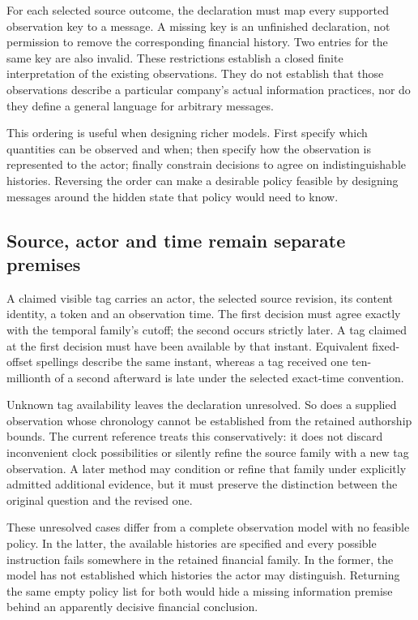 For each selected source outcome, the declaration must map every supported observation key to a message. A missing key is an unfinished declaration, not permission to remove the corresponding financial history. Two entries for the same key are also invalid. These restrictions establish a closed finite interpretation of the existing observations. They do not establish that those observations describe a particular company's actual information practices, nor do they define a general language for arbitrary messages.

This ordering is useful when designing richer models. First specify which quantities can be observed and when; then specify how the observation is represented to the actor; finally constrain decisions to agree on indistinguishable histories. Reversing the order can make a desirable policy feasible by designing messages around the hidden state that policy would need to know.

\subsection{Source, actor and time remain separate premises}

A claimed visible tag carries an actor, the selected source revision, its content identity, a token and an observation time. The first decision must agree exactly with the temporal family's cutoff; the second occurs strictly later. A tag claimed at the first decision must have been available by that instant. Equivalent fixed-offset spellings describe the same instant, whereas a tag received one ten-millionth of a second afterward is late under the selected exact-time convention.

Unknown tag availability leaves the declaration unresolved. So does a supplied observation whose chronology cannot be established from the retained authorship bounds. The current reference treats this conservatively: it does not discard inconvenient clock possibilities or silently refine the source family with a new tag observation. A later method may condition or refine that family under explicitly admitted additional evidence, but it must preserve the distinction between the original question and the revised one.

These unresolved cases differ from a complete observation model with no feasible policy. In the latter, the available histories are specified and every possible instruction fails somewhere in the retained financial family. In the former, the model has not established which histories the actor may distinguish. Returning the same empty policy list for both would hide a missing information premise behind an apparently decisive financial conclusion.

